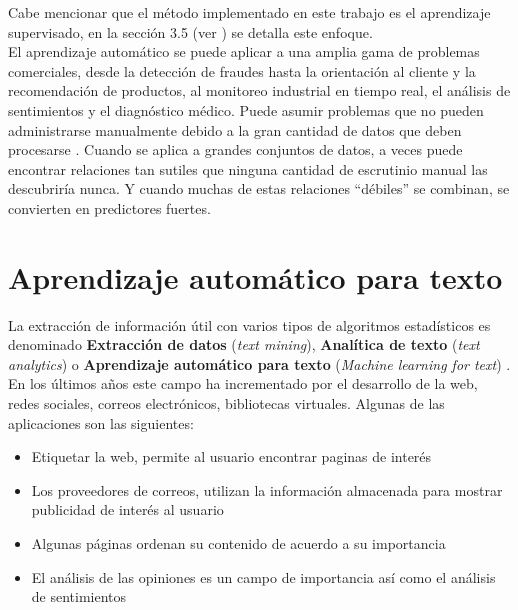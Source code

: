 Cabe mencionar que el método implementado en este trabajo es el aprendizaje supervisado, en la sección 3.5 (ver  ) se detalla este enfoque.\\

El aprendizaje automático se puede aplicar a una amplia gama de problemas comerciales, desde la detección de fraudes hasta la orientación al cliente y la recomendación de productos, al monitoreo industrial en tiempo real, el análisis de sentimientos y el diagnóstico médico. Puede asumir problemas que no pueden administrarse manualmente debido a la gran cantidad de datos que deben procesarse \citep{CT22}. Cuando se aplica a grandes conjuntos de datos, a veces puede encontrar relaciones tan sutiles que ninguna cantidad de escrutinio manual las descubriría nunca. Y cuando muchas de estas relaciones ``débiles'' se combinan, se convierten en predictores fuertes.






\section{Aprendizaje automático para texto}

La extracción de información útil con varios tipos de algoritmos estadísticos es denominado \textbf{Extracción de datos} (\textit{text mining}), \textbf{Analítica de texto} (\textit{text analytics}) o \textbf{Aprendizaje automático para texto} (\textit{Machine learning for text}) \citep{CD1}. En los últimos años este campo ha incrementado por el desarrollo de la web, redes sociales, correos electrónicos, bibliotecas virtuales. Algunas de las aplicaciones son las siguientes:

\begin{itemize}

	\item Etiquetar la web, permite al usuario encontrar paginas de interés

	\item Los proveedores de correos, utilizan la información almacenada para mostrar publicidad de interés al usuario

	\item Algunas páginas ordenan su contenido de acuerdo a su importancia

	\item El análisis de las opiniones es un campo de importancia así como el análisis de sentimientos		

\end{itemize}

